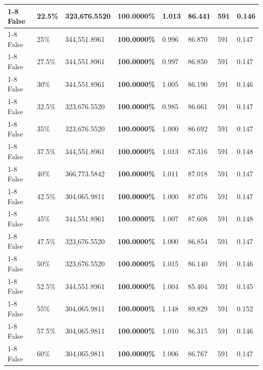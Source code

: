 \begin{table}[H]
\begin{tabular}{lllrllll}
\cline{1-8} \cline{2-8}
False & 22.5\% & 323,676.5520 & \bfseries \color{red} 100.0000\% & 1.013 & 86.441 & 591 & 0.146 \\
\cline{1-8} \cline{2-8}
False & 25\% & 344,551.8961 & \bfseries \color{red} 100.0000\% & 0.996 & 86.870 & 591 & 0.147 \\
\cline{1-8} \cline{2-8}
False & 27.5\% & 344,551.8961 & \bfseries \color{red} 100.0000\% & 0.997 & 86.850 & 591 & 0.147 \\
\cline{1-8} \cline{2-8}
False & 30\% & 344,551.8961 & \bfseries \color{red} 100.0000\% & 1.005 & 86.190 & 591 & 0.146 \\
\cline{1-8} \cline{2-8}
False & 32.5\% & 323,676.5520 & \bfseries \color{red} 100.0000\% & 0.985 & 86.661 & 591 & 0.147 \\
\cline{1-8} \cline{2-8}
False & 35\% & 323,676.5520 & \bfseries \color{red} 100.0000\% & 1.000 & 86.692 & 591 & 0.147 \\
\cline{1-8} \cline{2-8}
False & 37.5\% & 344,551.8961 & \bfseries \color{red} 100.0000\% & 1.013 & 87.316 & 591 & 0.148 \\
\cline{1-8} \cline{2-8}
False & 40\% & 366,773.5842 & \bfseries \color{red} 100.0000\% & 1.011 & 87.018 & 591 & 0.147 \\
\cline{1-8} \cline{2-8}
False & 42.5\% & \color{red} 304,065.9811 & \bfseries \color{red} 100.0000\% & 1.000 & 87.076 & 591 & 0.147 \\
\cline{1-8} \cline{2-8}
False & 45\% & 344,551.8961 & \bfseries \color{red} 100.0000\% & 1.007 & 87.608 & 591 & 0.148 \\
\cline{1-8} \cline{2-8}
False & 47.5\% & 323,676.5520 & \bfseries \color{red} 100.0000\% & 1.000 & 86.854 & 591 & 0.147 \\
\cline{1-8} \cline{2-8}
False & 50\% & 323,676.5520 & \bfseries \color{red} 100.0000\% & 1.015 & 86.140 & 591 & 0.146 \\
\cline{1-8} \cline{2-8}
False & 52.5\% & 344,551.8961 & \bfseries \color{red} 100.0000\% & 1.004 & 85.404 & 591 & 0.145 \\
\cline{1-8} \cline{2-8}
False & 55\% & \color{red} 304,065.9811 & \bfseries \color{red} 100.0000\% & 1.148 & 89.829 & 591 & 0.152 \\
\cline{1-8} \cline{2-8}
False & 57.5\% & \color{red} 304,065.9811 & \bfseries \color{red} 100.0000\% & 1.010 & 86.315 & 591 & 0.146 \\
\cline{1-8} \cline{2-8}
False & 60\% & \color{red} 304,065.9811 & \bfseries \color{red} 100.0000\% & 1.006 & 86.767 & 591 & 0.147 \\

\end{tabular}
\end{table}
